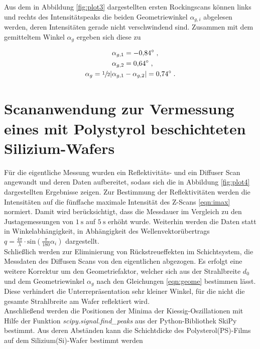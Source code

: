 Aus dem in Abbildung \ref{fig:plot3} dargestellten ersten Rockingscans
können links und rechts des Intensitätspeaks die beiden Geometriewinkel $\alpha_{g,i}$
abgelesen werden, deren Intensitäten gerade nicht verschwindend sind. 
Zusammen mit dem gemitteltem Winkel $\alpha_g$ ergeben sich diese zu

\vspace{-25pt}
\begin{align*}
    \alpha_{g,1} &= \SI{-0.84}{\degree} \; , \\
    \alpha_{g,2} &= \SI{0.64}{\degree} \; , \\
    \alpha_{g} = \sfrac{1}{2}|\alpha_{g,1} &- \alpha_{g,2}| = \SI{0.74}{\degree} \; .
\end{align*}


\section{Scananwendung zur Vermessung eines mit Polystyrol beschichteten Silizium-Wafers}

Für die eigentliche Messung wurden ein Reflektivitäts- und ein Diffuser Scan angewandt und deren Daten aufbereitet,
sodass sich die in Abbildung \ref{fig:plot4} dargestellten Ergebnisse zeigen.
Zur Bestimmung der Reflektivitäten werden die Intensitäten auf die fünffache maximale Intensität des 
Z-Scans \eqref{eqn:imax} normiert. Damit wird berücksichtigt, dass die Messdauer im Vergleich zu den Justagemessungen
von $\SI{1}{\second}$ auf $\SI{5}{\second}$ erhöht wurde.
Weiterhin werden die Daten statt in Winkelabhängigkeit, in Abhängigkeit des Wellenvektorübertrags 
$q = \frac{4\pi}{\lambda} \cdot \text{sin} \left(\frac{\pi}{180}\alpha_i\right)$ dargestellt.\\

Schließlich werden zur Eliminierung von Rückstreueffekten im Schichtsystem, die Messdaten des Diffusen Scans
von den eigentlichen abgezogen.
Es erfolgt eine weitere Korrektur um den Geometriefaktor, welcher sich aus der Strahlbreite $d_0$ und dem 
Geometriewinkel $\alpha_g$ nach den Gleichungen \eqref{eqn:geome} bestimmen lässt. 
Diese verhindert die Unterrepräsentation sehr kleiner Winkel, für die nicht die gesamte Strahlbreite am Wafer 
reflektiert wird.\\

Anschließend werden die Positionen der Minima der Kiessig-Oszillationen mit Hilfe der Funktion
\textit{scipy.signal.find\_peaks} aus der Python-Bibliothek SkiPy bestimmt.
Aus deren Abständen kann die Schichtdicke des Polysterol(PS)-Films auf dem Silizium(Si)-Wafer bestimmt werden

